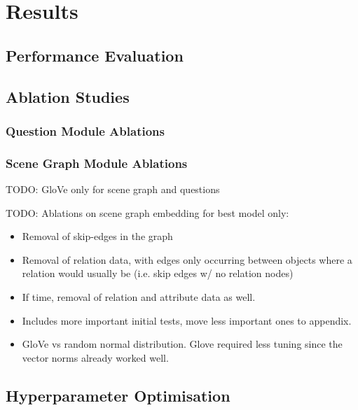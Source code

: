 \chapter{Results}

\section{Performance Evaluation}

\section{Ablation Studies}
\label{sec:ablation_studies}

\subsection{Question Module Ablations}
\label{subsec:question_module_ablations}

\subsection{Scene Graph Module Ablations}
\label{subsec:scene_graph_module_ablations}

{\color{red}TODO: GloVe only for scene graph and questions}

{\color{red}TODO: Ablations on scene graph embedding for best model only:
\begin{itemize}
    \item Removal of skip-edges in the graph
    \item Removal of relation data, with edges only occurring between objects where a relation would usually be (i.e. skip edges w/ no relation nodes)
    \item If time, removal of relation and attribute data as well.
\end{itemize}}

\begin{itemize}
    \item Includes more important initial tests, move less important ones to appendix.
\end{itemize}

\begin{itemize}
    \item GloVe vs random normal distribution. Glove required less tuning since the vector norms already worked well.
\end{itemize}

\section{Hyperparameter Optimisation}


